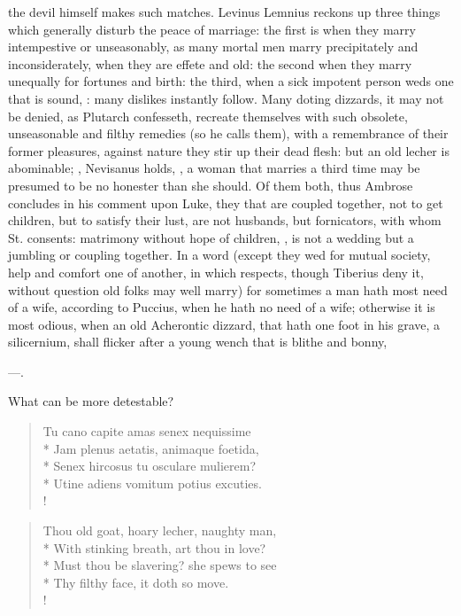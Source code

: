the devil himself makes such matches. Levinus Lemnius reckons up
three things which generally disturb the peace of marriage: the first
is when they marry intempestive or unseasonably, as many mortal men
marry precipitately and inconsiderately, when they are effete and old:
the second when they marry unequally for fortunes and birth: the third,
when a sick impotent person weds one that is sound, : many dislikes instantly follow. Many doting dizzards, it
may not be denied, as Plutarch confesseth, recreate themselves
with such obsolete, unseasonable and filthy remedies (so he calls
them), with a remembrance of their former pleasures, against nature
they stir up their dead flesh: but an old lecher is abominable; , Nevisanus holds, , a woman that marries a third time may be presumed to be no
honester than she should. Of them both, thus Ambrose concludes in his
comment upon Luke, they that are coupled together, not to get
children, but to satisfy their lust, are not husbands, but fornicators,
with whom St. \Austin{} consents: matrimony without hope of children, , is not a wedding but a jumbling
or coupling together. In a word (except they wed for mutual society,
help and comfort one of another, in which respects, though
Tiberius deny it, without question old folks may well marry) for
sometimes a man hath most need of a wife, according to Puccius, when he
hath no need of a wife; otherwise it is most odious, when an old
Acherontic dizzard, that hath one foot in his grave, a silicernium,
shall flicker after a young wench that is blithe and bonny,

---.

What can be more detestable?
%
\begin{latin}
\begin{verse}%
Tu cano capite amas senex nequissime\\*
Jam plenus aetatis, animaque foetida,\\*
Senex hircosus tu osculare mulierem?\\*
Utine adiens vomitum potius excuties.\\!
\end{verse}%
\end{latin}
\translationrule%
\begin{verse}%
Thou old goat, hoary lecher, naughty man,\\*
With stinking breath, art thou in love?\\*
Must thou be slavering? she spews to see\\*
Thy filthy face, it doth so move.\\!
\end{verse}%
%

